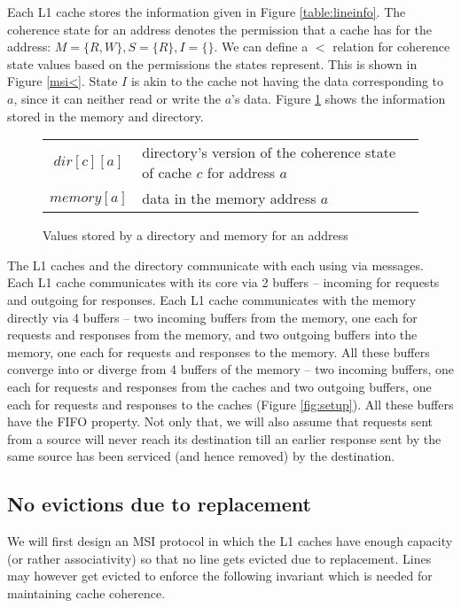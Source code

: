 Each L1 cache stores the information given in Figure \ref{table:lineinfo}. The
coherence state for an address denotes the permission that a cache has for the
address: $M = \{R, W\}, S = \{R\}, I = \{\}$. We can define a $<$ relation for
coherence state values based on the permissions the states represent. This is
shown in Figure \ref{msi<}. State $I$ is akin to the cache not having the data
corresponding to $a$, since it can neither read or write the $a$'s data. Figure
\ref{table:dirinfo} shows the information stored in the memory and directory. 

\begin{figure}
\begin{tabularx}{\linewidth}{|cX|}
\hline
$dir[c][a]$ & directory's version of the coherence state of cache $c$ for address $a$\\
$memory[a]$ & data in the memory address $a$\\
\hline
\end{tabularx}
\caption{Values stored by a directory and memory for an address}
\label{table:dirinfo}
\end{figure}

The L1 caches and the directory communicate with each using via messages. Each
L1 cache communicates with its core via 2 buffers -- incoming for requests and
outgoing for responses. Each L1 cache communicates with the memory directly via
4 buffers -- two incoming buffers from the memory, one each for requests and
responses from the memory, and two outgoing buffers into the memory, one each
for requests and responses to the memory. All these buffers converge into or
diverge from 4 buffers of the memory -- two incoming buffers, one each for
requests and responses from the caches and two outgoing buffers, one each for
requests and responses to the caches (Figure \ref{fig:setup}). All these
buffers have the FIFO property. Not only that, we will also assume that requests
sent from a source will never reach its destination till an earlier response
sent by the same source has been serviced (and hence removed) by the destination.

\subsection{No evictions due to replacement}
\label{sec:msi-magic}

We will first design an MSI protocol in which the L1 caches have enough
capacity (or rather associativity) so that no line gets evicted due to
replacement. Lines may however get evicted to enforce the following invariant
which is needed for maintaining cache coherence.

